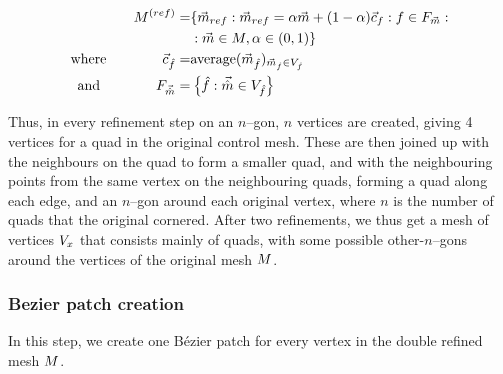 \begin{align}
\petersControlMesh^{(ref)} =& \lbrace \petersControlMeshVec_{ref} \suchthat\petersControlMeshVec_{ref} = \alpha\petersControlMeshVec + (1-\alpha)\centroidof{f} \suchthat f \in \facesof{\petersControlMeshVec} \suchthat
\\ \notag &
 \suchthat \petersControlMeshVec \in \petersControlMesh, \alpha \in (0,1) \rbrace
\\
\where \qquad\qquad \centroidof{\hat{f}} =& \text{average}(\petersControlMeshVec_{\hat{f}})_{\petersControlMeshVec_{\hat{f}} \in \verticesof{\hat{f}}}
\\
\text{and} \qquad\qquad F_{\vec{\hat{m}}} =& \left\lbrace \hat{f} \suchthat \vec{\hat{m}} \in \verticesof{\hat{f}}	\right\rbrace
\end{align}

Thus, in every refinement step on an $n$--gon, $n$ vertices are created, giving 4 vertices for a quad in the original control mesh. These are then joined up with the neighbours on the quad to form a smaller quad, and with the neighbouring points from the same vertex on the neighbouring quads, forming a quad along each edge, and an $n$--gon around each original vertex, where $n$ is the number of quads that the original cornered. After two refinements, we thus get a mesh of vertices $\petersPatchPoints$ that consists mainly of quads, with some possible other-$n$--gons around the vertices of the original mesh $\petersControlMesh$. 

\subsubsection{Bezier patch creation}
In this step, we create one B{\'e}zier patch for every vertex in the double refined mesh $\petersControlMesh$. 


